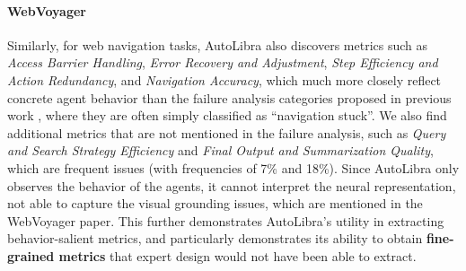 \paragraph{WebVoyager}
Similarly, for web navigation tasks, AutoLibra also discovers metrics such as \textit{Access
Barrier Handling}, \textit{Error Recovery and Adjustment}, \textit{Step
Efficiency and Action Redundancy}, and \textit{Navigation Accuracy}, which much more
closely reflect concrete agent behavior than the failure analysis categories proposed
in previous work \citep{he2024webvoyager,zhou2024proposeragentevaluatorpaeautonomousskilldiscovery},
where they are often simply classified as ``navigation stuck''. We also find
additional metrics that are not mentioned in the failure analysis, such as \textit{Query
and Search Strategy Efficiency} and \textit{Final Output and Summarization
Quality}, which are frequent issues (with frequencies of 7\% and 18\%). Since AutoLibra
only observes the behavior of the agents, it cannot interpret the neural
representation, not able to capture the visual grounding issues, which are
mentioned in the WebVoyager paper. This further demonstrates AutoLibra's utility
in extracting behavior-salient metrics, and particularly demonstrates its
ability to obtain \textbf{fine-grained metrics} that expert design would not have
been able to extract.
